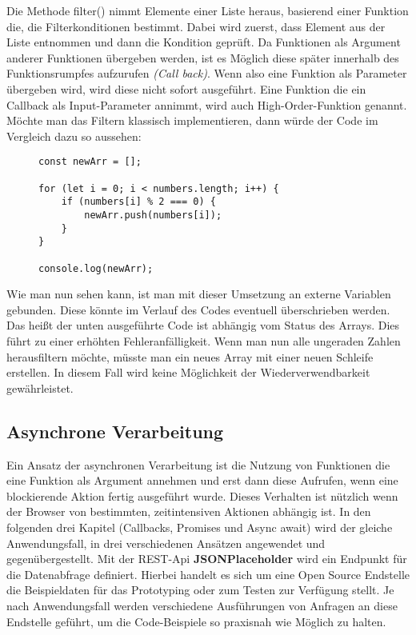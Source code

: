 \noindent
Die Methode filter() nimmt Elemente einer Liste heraus, basierend einer Funktion die, die Filterkonditionen bestimmt. Dabei wird zuerst, dass Element aus der Liste entnommen und dann die Kondition geprüft. Da Funktionen als Argument anderer Funktionen übergeben werden, ist es Möglich diese \glqq{}später\grqq{} innerhalb des Funktionsrumpfes aufzurufen \textit{(Call back)}. Wenn also eine Funktion als Parameter übergeben wird, wird diese nicht sofort ausgeführt. Eine Funktion die ein Callback als Input-Parameter annimmt, wird auch High-Order-Funktion genannt.\cite{callbacks-example} Möchte man das Filtern klassisch implementieren, dann würde der Code im Vergleich dazu so aussehen:

\begin{figure}[H]
\begin{lstlisting}[basicstyle=\small]
const newArr = [];

for (let i = 0; i < numbers.length; i++) {
    if (numbers[i] % 2 === 0) {
        newArr.push(numbers[i]);
    }
}

console.log(newArr);
\end{lstlisting}
\end{figure}

\noindent
Wie man nun sehen kann, ist man mit dieser Umsetzung an externe Variablen gebunden. Diese könnte im Verlauf des Codes eventuell überschrieben werden. Das heißt der unten ausgeführte Code ist abhängig vom Status des Arrays. Dies führt zu einer erhöhten Fehleranfälligkeit. Wenn man nun alle ungeraden Zahlen herausfiltern möchte, müsste man ein neues Array mit einer neuen Schleife erstellen. In diesem Fall wird keine Möglichkeit der Wiederverwendbarkeit gewährleistet.

\subsection{Asynchrone Verarbeitung}
Ein Ansatz der asynchronen Verarbeitung ist die Nutzung von Funktionen die eine Funktion als Argument annehmen und erst dann diese Aufrufen, wenn eine blockierende Aktion fertig ausgeführt wurde. Dieses Verhalten ist nützlich wenn der Browser von bestimmten, zeitintensiven Aktionen abhängig ist. In den folgenden drei Kapitel (Callbacks, Promises und Async await) wird der gleiche Anwendungsfall, in drei verschiedenen Ansätzen angewendet und gegenübergestellt. Mit der REST-Api \textbf{JSONPlaceholder} wird ein Endpunkt für die Datenabfrage definiert. Hierbei handelt es sich um eine Open Source Endstelle die Beispieldaten für das Prototyping oder zum Testen zur Verfügung stellt. Je nach Anwendungsfall werden verschiedene Ausführungen von Anfragen an diese Endstelle geführt, um die Code-Beispiele so praxisnah wie Möglich zu halten.

